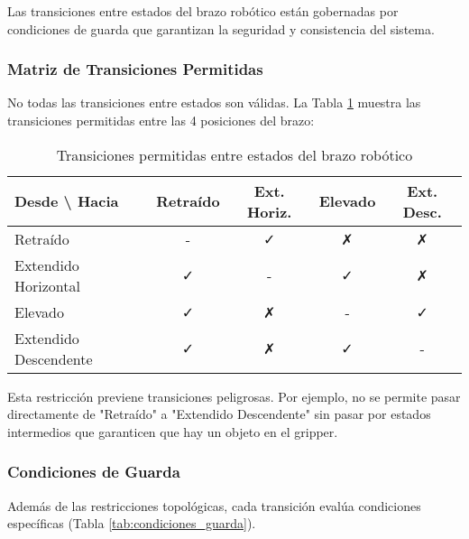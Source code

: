 Las transiciones entre estados del brazo robótico están gobernadas por condiciones de guarda que garantizan la seguridad y consistencia del sistema.

\subsubsection{Matriz de Transiciones Permitidas}

No todas las transiciones entre estados son válidas. La Tabla \ref{tab:transiciones_brazo} muestra las transiciones permitidas entre las 4 posiciones del brazo:

\begin{table}[H]
\centering
\caption{Transiciones permitidas entre estados del brazo robótico}
\label{tab:transiciones_brazo}
\begin{tabular}{|l|c|c|c|c|}
\hline
\textbf{Desde \textbackslash{} Hacia} & \textbf{Retraído} & \textbf{Ext. Horiz.} & \textbf{Elevado} & \textbf{Ext. Desc.} \\
\hline
Retraído & - & ✓ & ✗ & ✗ \\
\hline
Extendido Horizontal & ✓ & - & ✓ & ✗ \\
\hline
Elevado & ✓ & ✗ & - & ✓ \\
\hline
Extendido Descendente & ✓ & ✗ & ✓ & - \\
\hline
\end{tabular}
\end{table}

Esta restricción previene transiciones peligrosas. Por ejemplo, no se permite pasar directamente de "Retraído" a "Extendido Descendente" sin pasar por estados intermedios que garanticen que hay un objeto en el gripper.

\subsubsection{Condiciones de Guarda}

Además de las restricciones topológicas, cada transición evalúa condiciones específicas (Tabla \ref{tab:condiciones_guarda}).

